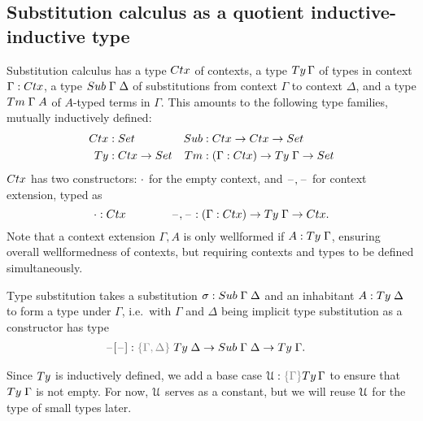 \documentclass[a4paper,UKenglish,numberwithinsect,cleveref,thm-restate]{lipics-v2021}
\begin{document}
\subsection{Substitution calculus as a quotient inductive-inductive type} \label{subsec:SC-QIIT}

Substitution calculus has a type $\Ctx$ of contexts, a type $\Ty\,\Gamma$ of types in context $\Gamma : \Ctx$, a type $\Sub\;\Gamma\;\Delta$ of substitutions from context $\Gamma$ to context $\Delta$, and a type $\Tm\;\Gamma\;A$ of $A$-typed terms in $\Gamma$. 
This amounts to the following type families, mutually inductively defined:
\begin{align*}
  \Ctx   & : \Set                   & \Sub   & : \Ctx \to \Ctx \to \Set \\
  \Ty    & : \Ctx \to \Set          & \Tm    & : (\Gamma : \Ctx) \to \Ty\;\Gamma \to \Set
\end{align*}
$\Ctx$ has two constructors: $\cdot$ for the empty context, and $\mathord{\hspace{1pt}\text{--}\hspace{1pt}},\mathord{\hspace{1pt}\text{--}\hspace{1pt}}$ for context extension, typed as
\[
  \emptyctx : \Ctx
  \qquad\qquad
  \blank,\blank : (\Gamma : \Ctx) \to \Ty\;\Gamma \to \Ctx.
\]
Note that a context extension $\Gamma , A$ is only wellformed if $A : \Ty\;\Gamma$, ensuring overall wellformedness of contexts, but requiring contexts and types to be defined simultaneously.

Type substitution takes a substitution $\sigma : \Sub\;\Gamma\;\Delta$ and an inhabitant $A : \Ty\;\Delta$ to form a type under $\Gamma$, i.e.\ with $\Gamma$ and $\Delta$ being implicit type substitution as a constructor has type
\begin{alignat*}{3}
  \sub{\blank}{\blank} &: \implicit{\Gamma, \Delta} \; \Ty\;\Delta \to \Sub\;\Gamma\;\Delta \to \Ty\;\Gamma .
\end{alignat*}

Since $\Ty$ is inductively defined, we add a base case $\UU : \implicit{\Gamma} \Ty\,\Gamma$ to ensure that $\Ty\;\Gamma$ is not empty.
%
For now, $\mathcal{U}$ serves as a constant, but we will reuse $\mathcal{U}$ for the type of small types later.
\end{document}
